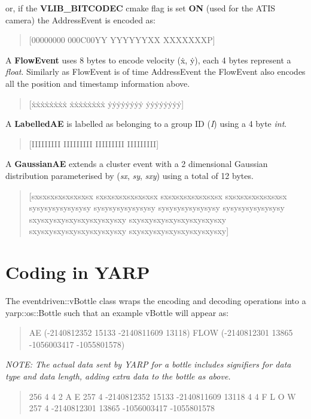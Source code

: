 or, if the {\bfseries V\+L\+I\+B\+\_\+B\+I\+T\+C\+O\+D\+EC} cmake flag is set {\bfseries ON} (used for the A\+T\+IS camera) the Address\+Event is encoded as\+:

\begin{quote}
\mbox{[}00000000 000\+C00\+YY Y\+Y\+Y\+Y\+Y\+Y\+XX X\+X\+X\+X\+X\+X\+XP\mbox{]} \end{quote}


A {\bfseries Flow\+Event} uses 8 bytes to encode velocity (ẋ, ẏ), each 4 bytes represent a {\itshape float}. Similarly as Flow\+Event is of time Address\+Event the Flow\+Event also encodes all the position and timestamp information above.

\begin{quote}
\mbox{[}ẋẋẋẋẋẋẋẋ ẋẋẋẋẋẋẋẋ ẏẏẏẏẏẏẏẏ ẏẏẏẏẏẏẏẏ\mbox{]} \end{quote}


A {\bfseries Labelled\+AE} is labelled as belonging to a group ID ({\itshape I}) using a 4 byte {\itshape int}.

\begin{quote}
\mbox{[}I\+I\+I\+I\+I\+I\+I\+II I\+I\+I\+I\+I\+I\+I\+II I\+I\+I\+I\+I\+I\+I\+II I\+I\+I\+I\+I\+I\+I\+II\mbox{]} \end{quote}


A {\bfseries Gaussian\+AE} extends a cluster event with a 2 dimensional Gaussian distribution parameterised by ({\itshape sx}, {\itshape sy}, {\itshape sxy}) using a total of 12 bytes.

\begin{quote}
\mbox{[}sxsxsxsxsxsxsxsx sxsxsxsxsxsxsxsx sxsxsxsxsxsxsxsx sxsxsxsxsxsxsxsx sysysysysysysysy sysysysysysysysy sysysysysysysysy sysysysysysysysy sxysxysxysxysxysxysxysxy sxysxysxysxysxysxysxysxy sxysxysxysxysxysxysxysxy sxysxysxysxysxysxysxysxy\mbox{]} \end{quote}


\section*{Coding in Y\+A\+RP}

The eventdriven\+::v\+Bottle class wraps the encoding and decoding operations into a yarp\+::os\+::\+Bottle such that an example v\+Bottle will appear as\+:

\begin{quote}
AE (-\/2140812352 15133 -\/2140811609 13118) F\+L\+OW (-\/2140812301 13865 -\/1056003417 -\/1055801578) \end{quote}


{\itshape N\+O\+TE\+: The actual data sent by Y\+A\+RP for a bottle includes signifiers for data type and data length, adding extra data to the bottle as above.}

\begin{quote}
256 4 4 2 \textquotesingle{}A\textquotesingle{} \textquotesingle{}E\textquotesingle{} 257 4 -\/2140812352 15133 -\/2140811609 13118 4 4 \textquotesingle{}F\textquotesingle{} \textquotesingle{}L\textquotesingle{} \textquotesingle{}O\textquotesingle{} \textquotesingle{}W\textquotesingle{} 257 4 -\/2140812301 13865 -\/1056003417 -\/1055801578\end{quote}
